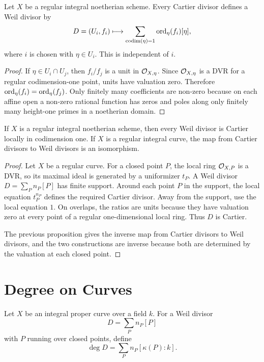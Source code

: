 \begin{proposition}
Let \(X\) be a regular integral noetherian scheme.  Every Cartier divisor
defines a Weil divisor by
\[
    D=(U_i,f_i)\longmapsto
    \sum_{\operatorname{codim}(\eta)=1}\operatorname{ord}_\eta(f_i)[\eta],
\]
where \(i\) is chosen with \(\eta\in U_i\).  This is independent of \(i\).
\end{proposition}

\begin{proof}
If \(\eta\in U_i\cap U_j\), then \(f_i/f_j\) is a unit in
\(\mathcal{O}_{X,\eta}\).  Since \(\mathcal{O}_{X,\eta}\) is a DVR for a regular
codimension-one point, units have valuation zero.  Therefore
\(\operatorname{ord}_\eta(f_i)=\operatorname{ord}_\eta(f_j)\).  Only finitely many coefficients are
non-zero because on each affine open a non-zero rational function has zeros
and poles along only finitely many height-one primes in a noetherian domain.
\end{proof}

\begin{proposition}
If \(X\) is a regular integral noetherian scheme, then every Weil divisor is
Cartier locally in codimension one.  If \(X\) is a regular integral curve, the
map from Cartier divisors to Weil divisors is an isomorphism.
\end{proposition}

\begin{proof}
Let \(X\) be a regular curve.  For a closed point \(P\), the local ring
\(\mathcal{O}_{X,P}\) is a DVR, so its maximal ideal is generated by a uniformizer
\(t_P\).  A Weil divisor \(D=\sum_P n_P[P]\) has finite support.  Around each
point \(P\) in the support, the local equation \(t_P^{n_P}\) defines the
required Cartier divisor.  Away from the support, use the local equation \(1\).
On overlaps, the ratios are units because they have valuation zero at every
point of a regular one-dimensional local ring.  Thus \(D\) is Cartier.

The previous proposition gives the inverse map from Cartier divisors to Weil
divisors, and the two constructions are inverse because both are determined by
the valuation at each closed point.
\end{proof}

\section{Degree on Curves}

\begin{definition}
Let \(X\) be an integral proper curve over a field \(k\).  For a Weil divisor
\[
    D=\sum_P n_P[P]
\]
with \(P\) running over closed points, define
\[
    \deg D=\sum_P n_P[\kappa(P):k].
\]
\end{definition}

